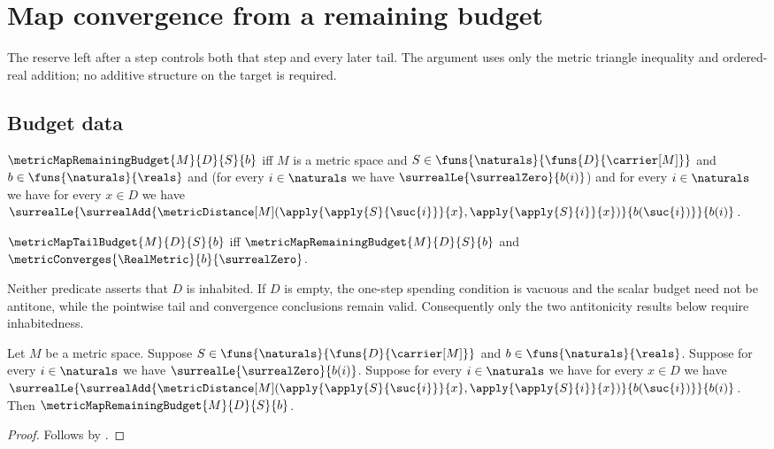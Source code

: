 



\section{Map convergence from a remaining budget}

The reserve left after a step controls both that step and every later tail.
The argument uses only the metric triangle inequality and ordered-real
addition; no additive structure on the target is required.

\subsection{Budget data}

\begin{definition}\label{metric_map_remaining_budget_def}
    $\metricMapRemainingBudget{M}{D}{S}{b}$ iff
        $M$ is a metric space and
        $S\in\funs{\naturals}{\funs{D}{\carrier[M]}}$ and
        $b\in\funs{\naturals}{\reals}$ and
        (for every $i\in\naturals$ we have
            $\surrealLe{\surrealZero}{b(i)}$) and
        for every $i\in\naturals$ we have for every $x\in D$ we have
            $\surrealLe{
                \surrealAdd{
                    \metricDistance[M]
                        (\apply{\apply{S}{\suc{i}}}{x},
                         \apply{\apply{S}{i}}{x})}
                    {b(\suc{i})}}
                {b(i)}$.
\end{definition}

\begin{definition}\label{metric_map_tail_budget_def}
    $\metricMapTailBudget{M}{D}{S}{b}$ iff
        $\metricMapRemainingBudget{M}{D}{S}{b}$ and
        $\metricConverges{\RealMetric}{b}{\surrealZero}$.
\end{definition}

Neither predicate asserts that $D$ is inhabited.  If $D$ is empty, the
one-step spending condition is vacuous and the scalar budget need not be
antitone, while the pointwise tail and convergence conclusions remain valid.
Consequently only the two antitonicity results below require inhabitedness.

\begin{proposition}\label{metric_map_remaining_budget_intro}
    Let $M$ be a metric space.
    Suppose $S\in\funs{\naturals}{\funs{D}{\carrier[M]}}$ and
        $b\in\funs{\naturals}{\reals}$.
    Suppose for every $i\in\naturals$ we have
        $\surrealLe{\surrealZero}{b(i)}$.
    Suppose for every $i\in\naturals$ we have for every $x\in D$ we have
        $\surrealLe{
            \surrealAdd{
                \metricDistance[M]
                    (\apply{\apply{S}{\suc{i}}}{x},
                     \apply{\apply{S}{i}}{x})}
                {b(\suc{i})}}
            {b(i)}$.
    Then $\metricMapRemainingBudget{M}{D}{S}{b}$.
\end{proposition}
\begin{proof}
    Follows by .
\end{proof}

